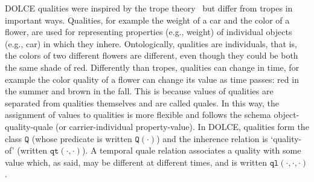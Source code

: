 \documentclass[sw]{iosart2x}
\newcommand{\generalStyle}[1]{\texttt{#1}}
\newcommand{\biRel}[3]{\generalStyle{#1}(#2,#3)}
\newcommand{\uniRel}[2]{\generalStyle{#1}(#2)}
\newcommand{\triRel}[4]{\generalStyle{#1}(#2,#3,#4)}
\newcommand{\DOLCE}{\textsc{DOLCE}\xspace} %
\newcommand{\DOLCEQuality}[1]{\uniRel{Q}{#1}}
\newcommand{\DOLCEQualityDirect}[2]{\biRel{qt}{#1}{#2}}
\newcommand{\DOLCEQualeDirectTer}[3]{\triRel{{ql}}{#1}{#2}{#3}}
\newcommand{\quotes}[1]{`#1'}
\newcommand{\TODO}[1]{{%
}}
\newcommand{\myComment}[1]{{\unskip \ignorespaces}}
\begin{document}
\DOLCE qualities \myComment{are similar to} were inspired by the trope theory~\cite{Campbell90} but differ from tropes in important ways. Qualities, for example the weight of a car and the color of a flower, are used for representing properties (e.g., weight) of individual objects (e.g., car) in which they inhere.
Ontologically, qualities are individuals, that is, the colors of two different flowers are different, even though they could be both the same shade of red.
Differently than tropes, qualities can change in time, for example the color quality of a flower can change its value as time passes: red in the summer and brown in the fall.
This is because values of qualities are separated from qualities themselves and are called quales. 
In this way, the assignment of values to qualities is more flexible and follows the schema object-quality-quale (or carrier-individual property-value).
In \DOLCE, qualities form the class $\generalStyle{Q}$\TODO{S: qui c'è confusione tra classe (Q) e predicato (Q(.)), ho cercato di sistemare ma il comando "DOLCEQuality" dovrebbe comparire senza parentesi. [FC: LaTeX non concede tali comodità facilmente. Ho corretto ad-hoc, ignorando il comando]} (whose predicate is written $\DOLCEQuality{\cdot}$) and the inherence relation is \quotes{quality-of} (written $\DOLCEQualityDirect{\cdot}{\cdot}$). A temporal quale relation associates a quality with some value which, as said, may be different at different times, and is written $\DOLCEQualeDirectTer{\cdot}{\cdot}{\cdot}$.%
\end{document}
